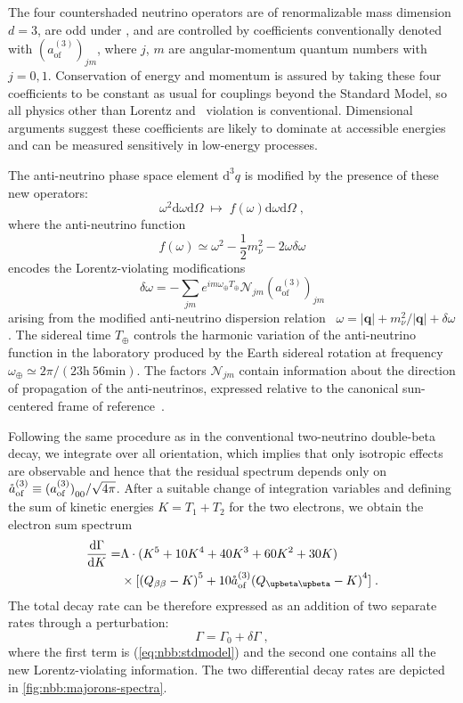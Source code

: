 The four countershaded neutrino operators are of renormalizable mass dimension
$d = 3$, are odd under \cpt, and are controlled by coefficients conventionally
denoted with ${(a^{(3)}_\text{of})}_{jm}$, where $j$, $m$ are angular-momentum
quantum numbers with $j = 0,1$. Conservation of energy and momentum is assured
by taking these four coefficients to be constant as usual for couplings beyond
the Standard Model, so all physics other than Lorentz and \cpt\ violation is
conventional. Dimensional arguments suggest these coefficients are likely to
dominate at accessible energies and can be measured sensitively in low-energy
processes.

The anti-neutrino phase space element $\text{d}^3q$ is modified by the presence
of these new operators:
\[
  \omega^2\text{d}\omega\text{d}\Omega \;\longmapsto\;
    f(\omega)\text{d}\omega\text{d}\Omega\;,
\]
where the anti-neutrino function
\[
  f(\omega)\simeq\omega^2-\frac{1}{2}m_\nu^2-2\omega\delta\omega
\]
encodes the Lorentz-violating modifications
\[
  \delta\omega = -\sum_{jm} e^{im\omega_\oplus T_\oplus}
  \mathcal{N}_{jm}{(a_\text{of}^{(3)})}_{jm}
\]
arising from the modified anti-neutrino dispersion
relation~\cite{Kostelecky2012} $\omega = |\mathbf{q}| + m_\nu^2 / |\mathbf{q}|
+ \delta\omega$. The sidereal time $T_\oplus$ controls the harmonic variation
of the anti-neutrino function in the laboratory produced by the Earth sidereal
rotation at frequency $\omega_\oplus \simeq 2\pi/(23\text{h}~56\text{min})$.
The factors $\mathcal{N}_{jm}$ contain information about the direction of
propagation of the anti-neutrinos, expressed relative to the canonical
sun-centered frame of reference~\cite{Bluhm2003, Kostelecky2002}.

Following the same procedure as in the conventional two-neutrino double-beta
decay, we integrate over all orientation, which implies that only isotropic
effects are observable and hence that the residual spectrum depends only on
${\mathring{a}_\text{of}^{(3)}} \equiv {{(a_\text{of}^{(3)})}_{00}}/\sqrt{4\pi}$. After a suitable change of
integration variables and defining the sum of kinetic energies $K=T_1+T_2$ for
the two electrons, we obtain the electron sum spectrum
\begin{equation}\label{eq:nbb:totwidth}
  \begin{split}
    \frac{\text{d}\Gamma}{\text{d}K} = &
      \Lambda \cdot (K^5 + 10K^4 + 40K^3 + 60K^2 + 30K) \\
      & \times[{(Q_{\beta\beta} - K)}^5 + 10 \aofM {(Q_{\upbeta\upbeta} - K)}^4] \;. \\
  \end{split}
\end{equation}
The total decay rate can be therefore expressed as an addition of two separate
rates through a perturbation:
\[
  \Gamma = \Gamma_0 + \delta\Gamma \;,
\]
where the first term is (\ref{eq:nbb:stdmodel}) and the second one contains all
the new Lorentz-violating information. The two differential decay rates are
depicted in \cref{fig:nbb:majorons-spectra}.

